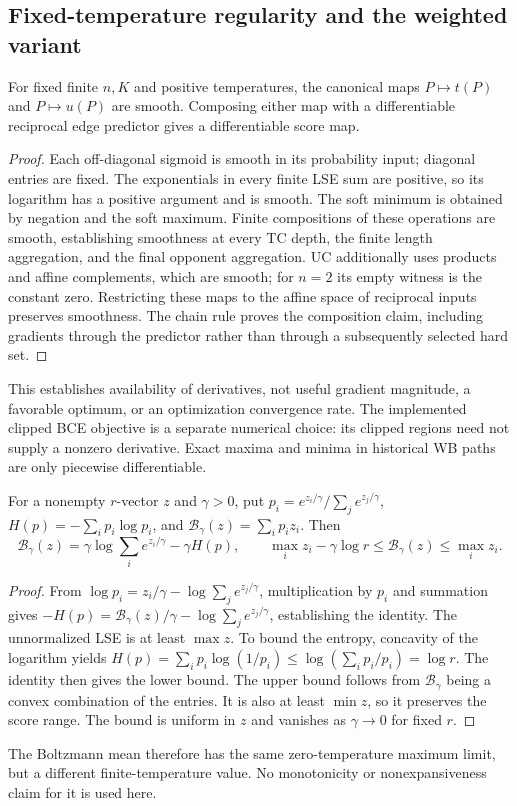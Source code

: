 \subsection{Fixed-temperature regularity and the weighted variant}
\begin{proposition}\label{prop:canonical-smooth}
For fixed finite $n,K$ and positive temperatures, the canonical maps $P\mapsto t(P)$ and $P\mapsto u(P)$ are smooth. Composing either map with a differentiable reciprocal edge predictor gives a differentiable score map.
\end{proposition}
\begin{proof}
Each off-diagonal sigmoid is smooth in its probability input; diagonal entries are fixed. The exponentials in every finite LSE sum are positive, so its logarithm has a positive argument and is smooth. The soft minimum is obtained by negation and the soft maximum. Finite compositions of these operations are smooth, establishing smoothness at every TC depth, the finite length aggregation, and the final opponent aggregation. UC additionally uses products and affine complements, which are smooth; for $n=2$ its empty witness is the constant zero. Restricting these maps to the affine space of reciprocal inputs preserves smoothness. The chain rule proves the composition claim, including gradients through the predictor rather than through a subsequently selected hard set.
\end{proof}
This establishes availability of derivatives, not useful gradient magnitude, a favorable optimum, or an optimization convergence rate. The implemented clipped BCE objective is a separate numerical choice: its clipped regions need not supply a nonzero derivative. Exact maxima and minima in historical WB paths are only piecewise differentiable.

\begin{lemma}\label{lem:boltzmann-bound}
For a nonempty $r$-vector $z$ and $\gamma>0$, put $p_i=e^{z_i/\gamma}/\sum_j e^{z_j/\gamma}$, $H(p)=-\sum_ip_i\log p_i$, and $\mathcal B_\gamma(z)=\sum_ip_iz_i$. Then
\[
\mathcal B_\gamma(z)=\gamma\log\sum_i e^{z_i/\gamma}-\gamma H(p),\qquad
\max_i z_i-\gamma\log r\le\mathcal B_\gamma(z)\le\max_i z_i.
\]
\end{lemma}
\begin{proof}
From $\log p_i=z_i/\gamma-\log\sum_j e^{z_j/\gamma}$, multiplication by $p_i$ and summation gives $-H(p)=\mathcal B_\gamma(z)/\gamma-\log\sum_j e^{z_j/\gamma}$, establishing the identity. The unnormalized LSE is at least $\max z$. To bound the entropy, concavity of the logarithm yields
$H(p)=\sum_ip_i\log(1/p_i)\le\log(\sum_ip_i/p_i)=\log r$.
The identity then gives the lower bound. The upper bound follows from $\mathcal B_\gamma$ being a convex combination of the entries. It is also at least $\min z$, so it preserves the score range. The bound is uniform in $z$ and vanishes as $\gamma\to0$ for fixed $r$.
\end{proof}
The Boltzmann mean therefore has the same zero-temperature maximum limit, but a different finite-temperature value. No monotonicity or nonexpansiveness claim for it is used here.

